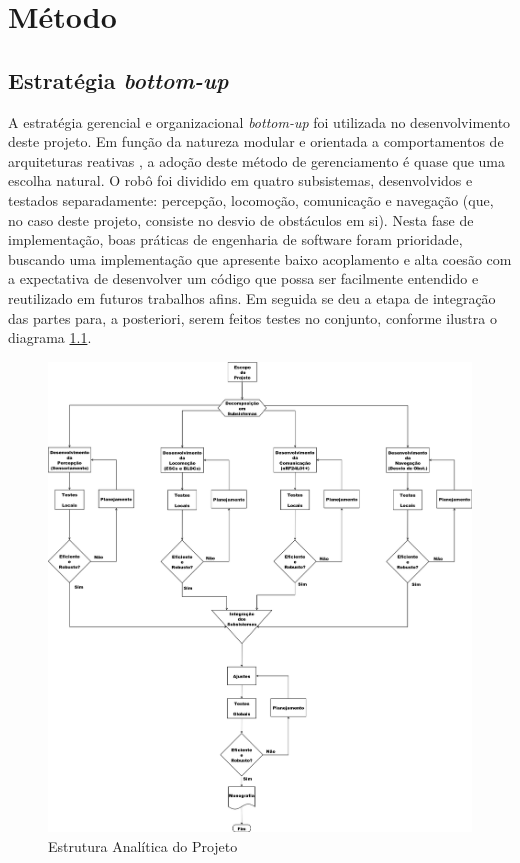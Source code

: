 \chapter{Método}
\section{Estratégia \textit{bottom-up}}
A estratégia gerencial e organizacional \textit{bottom-up} foi utilizada no desenvolvimento deste projeto. 
Em função da natureza modular e orientada a comportamentos de arquiteturas reativas \cite{murphy}, a adoção deste método de gerenciamento é quase que 
uma escolha natural.
O robô foi dividido em quatro subsistemas, desenvolvidos e testados separadamente: percepção, locomoção, comunicação e navegação (que, no caso deste 
projeto, consiste no desvio de obstáculos em si). %
Nesta fase de implementação,  boas práticas de engenharia de software foram prioridade, buscando uma implementação que 
apresente baixo acoplamento  e alta coesão com a expectativa de desenvolver um código que possa ser facilmente entendido e reutilizado em futuros 
trabalhos afins.
Em seguida se deu a etapa de integração das partes para, a posteriori, serem feitos testes no conjunto, conforme ilustra o diagrama \ref{WBS}.

  \begin{figure}[H] %
    \centering
    \includegraphics[width= 0.7 \linewidth]{../../Imagens/WBS.png}
    \caption{Estrutura Analítica do Projeto} %
    \label{WBS}
  \end{figure}

